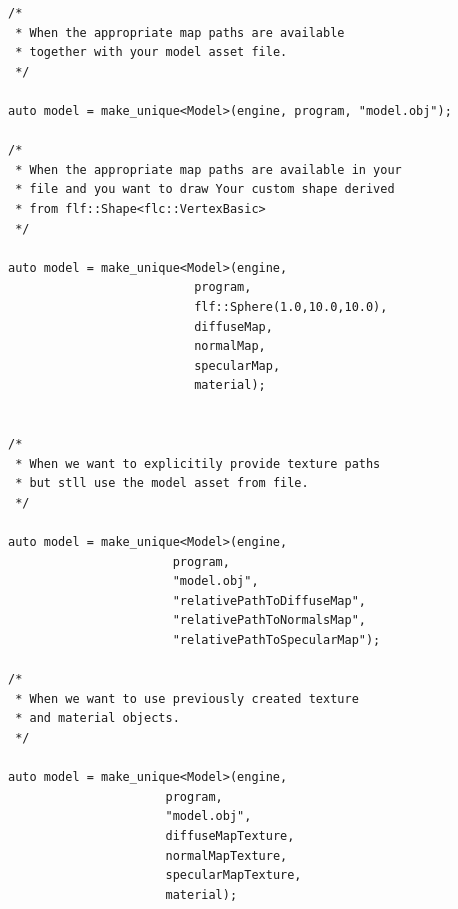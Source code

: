 \documentclass{article}
\begin{document}
\begin{lstlisting}
/* 
 * When the appropriate map paths are available
 * together with your model asset file.
 */

auto model = make_unique<Model>(engine, program, "model.obj");

/*
 * When the appropriate map paths are available in your
 * file and you want to draw Your custom shape derived 
 * from flf::Shape<flc::VertexBasic>
 */

auto model = make_unique<Model>(engine,
                          program,
                          flf::Sphere(1.0,10.0,10.0),
                          diffuseMap,
                          normalMap,
                          specularMap,
                          material);
    
         
/* 
 * When we want to explicitily provide texture paths
 * but stll use the model asset from file.   
 */
                      
auto model = make_unique<Model>(engine,
                       program,
                       "model.obj",
                       "relativePathToDiffuseMap",
                       "relativePathToNormalsMap",
                       "relativePathToSpecularMap");
                       
/*
 * When we want to use previously created texture
 * and material objects.
 */

auto model = make_unique<Model>(engine,
                      program,
                      "model.obj",
                      diffuseMapTexture,
                      normalMapTexture,
                      specularMapTexture,
                      material);
\end{lstlisting}
\end{document}
